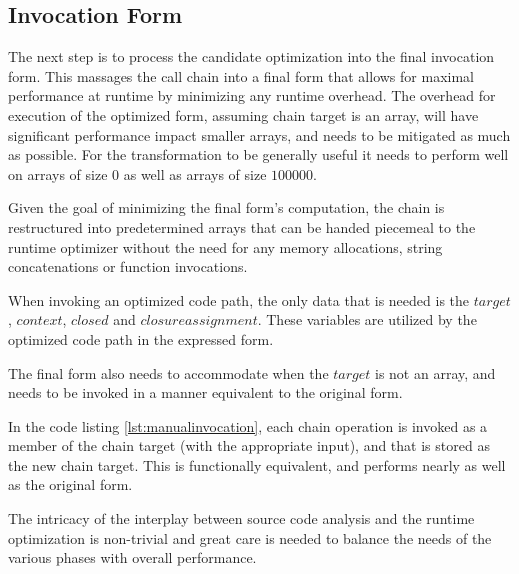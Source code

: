 \subsection{Invocation Form}
The next step is to process the candidate optimization into the final invocation form.  This massages the call chain into a final form that allows for maximal performance at runtime by minimizing any runtime overhead.  The overhead for execution of the optimized form, assuming chain target is an array, will have significant performance impact smaller arrays, and needs to be mitigated as much as possible.  For the transformation to be generally useful it needs to perform well on arrays of size $0$ as well as arrays of size $100000$.  

\begin{minipage}{\linewidth}

\end{minipage}

Given the goal of minimizing the final form's computation, the chain is restructured into predetermined arrays that can be handed piecemeal to the runtime optimizer without the need for any memory allocations, string concatenations or function invocations.

When invoking an optimized code path, the only data that is needed is the $target$, $context$, $closed$ and $closure assignment$.  These variables are utilized by the optimized code path in the expressed form. 

The final form also needs to accommodate when the $target$ is not an array, and needs to be invoked in a manner equivalent to the original form.  \\

\begin{minipage}{\linewidth}

\end{minipage}

In the code listing \ref{lst:manualinvocation}, each chain operation is invoked as a member of the chain target (with the appropriate input), and that is stored as the new chain target.  This is functionally equivalent, and performs nearly as well as the original form. %




The intricacy of the interplay between source code analysis and the runtime optimization is non-trivial and great care is needed to balance the needs of the various phases with overall performance.  